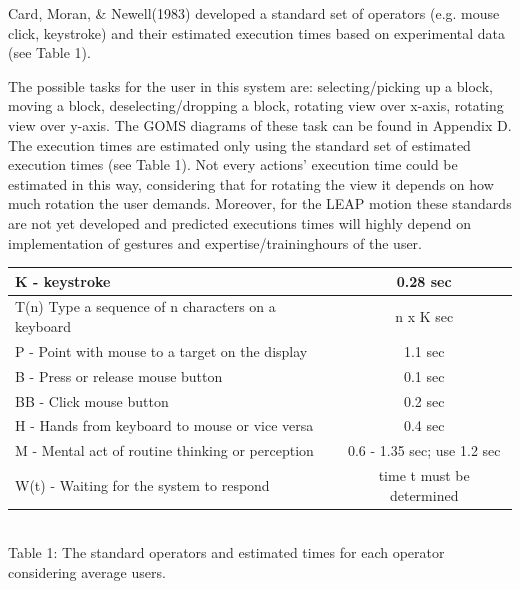 Card, Moran, & Newell(1983) developed a standard set of operators (e.g. mouse click, keystroke) and their estimated execution times based on experimental data (see Table 1). 

The possible tasks for the user in this system are: selecting/picking up a block, moving a block, deselecting/dropping a block, rotating view over x-axis, rotating view over y-axis. The GOMS diagrams of these task can be found in Appendix D. The execution times are estimated only using the standard set of estimated execution times (see Table 1). Not every actions' execution time could be estimated in this way, considering that for rotating the view it depends on how much rotation the user demands. Moreover, for the LEAP motion these standards are not yet developed and predicted executions times will highly depend on implementation of gestures and expertise/traininghours of the user.


\begin{table} [!htbp]
\begin{tabular}{|l|c|}
\hline
K - keystroke & 0.28 sec\\ \hline
T(n) Type a sequence of n characters on a keyboard & n x K sec \\ \hline
P - Point with mouse to a target on the display & 1.1 sec \\ \hline
B - Press or release mouse button & 0.1 sec \\ \hline
BB - Click mouse button & 0.2 sec \\ \hline
H - Hands from keyboard to mouse or vice versa & 0.4 sec \\  \hline
M - Mental act of routine thinking or perception & 0.6 - 1.35 sec; use 1.2 sec \\ \hline
W(t) - Waiting for the system to respond & time t must be determined \\ 
\hline
\end{tabular}
\\[2.5]
Table 1: The standard operators and estimated times for each operator considering average users.
\end{table}

